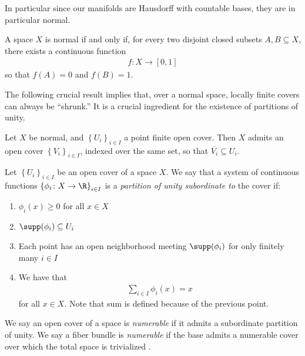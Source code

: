 \documentclass[11pt]{book}
\begin{document}
In particular since our manifolds are Hausdorff with countable bases, they are in particular normal.

\begin{lemma}
\label{lem:urysohn} 
A space $X$ is normal if and only if, for every two disjoint closed subsets $A,B \subseteq X$, there exists a continuous function
\begin{align*}
    f \colon X \to [0,1]
\end{align*}
so that $f(A) =0$ and $f(B) =1$.
\end{lemma}

The following crucial result implies that, over a normal space, locally finite covers can always be ``shrunk.'' It is a crucial ingredient for the existence of partitions of unity.

\begin{theorem}
\label{thm:shrinking}
Let $X$ be normal, and $\left\{ U_i \right\}_{i\in I}$ a point finite open cover. Then $X$ admits an open cover $\left\{ V_i \right\}_{i\in I}$, indexed over the same set, so that $\overline{V_i} \subseteq U_i$.
\end{theorem}

\begin{definition}\label{def:partition-of-unity} 
Let $\left\{ U_i \right\}_{i\in I}$ be an open cover of a space $X$. We say that a system of continuous functions $\left\{ \phi_i \colon X \to \R \right\}_{i\in I}$ is a \emph{partition of unity subordinate to} the cover if:
\begin{enumerate}
    \item $\phi_i(x) \ge 0$ for all $x\in X$
    \item $\supp(\phi_i) \subseteq U_i$
    \item Each point has an open neighborhood meeting $\supp(\phi_i)$ for only finitely many $i\in I$
    \item We have that
    \begin{align*}
        \sum_{i\in I}\phi_i(x) = x
    \end{align*}
    for all $x\in X$. Note that sum is defined because of the previous point.
\end{enumerate}
\end{definition}

\begin{definition}\label{def:numerable-open-cover}
We say an open cover of a space is \emph{numerable} if it admits a subordinate partition of unity. We say a fiber bundle is \emph{numerable} if the base admits a numerable cover over which the total space is trivialized \cite[7.1]{doldPartitionsUnityTheory1963}.
\end{definition}
\end{document}
